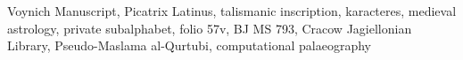 Voynich Manuscript, Picatrix Latinus, talismanic inscription, karacteres, medieval astrology, private subalphabet, folio 57v, BJ MS 793, Cracow Jagiellonian Library, Pseudo-Maslama al-Qurtubi, computational palaeography
